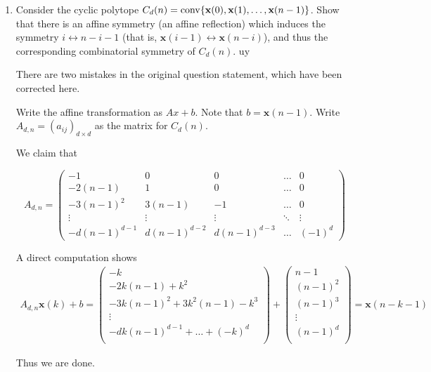 \documentclass{article}
\begin{document}
\begin{enumerate}
\item Consider the cyclic polytope $C_d(n) = \operatorname{conv}\{\textbf{x}(0), \textbf{x}(1), \ldots, \textbf{x}(n-1)\}$.
Show that there is an affine symmetry (an affine reflection) which induces the symmetry
$i \longleftrightarrow n-i-1$ (that is, $\textbf{x}(i-1) \longleftrightarrow \textbf{x}(n-i)$), and thus the
corresponding combinatorial symmetry of $C_d(n)$.
uy
\begin{remark}
    There are two mistakes in the original question statement, which have been corrected here.
\end{remark}
\begin{solution}
Write the affine transformation as $Ax+b$. Note that $b = \textbf{x}(n-1)$. Write $A_{d,n} = (a_{ij})_{d \times d}$ as the matrix for $C_d(n)$.

We claim that

\[A_{d, n} = \begin{pmatrix}
    -1 & 0 & 0 & \ldots & 0 \\
    -2(n-1) & 1 & 0 & \ldots & 0\\
    -3(n-1)^2 & 3(n-1) & -1 &  \ldots & 0 \\
    \vdots & \vdots & \vdots  & \ddots & \vdots \\
    -d(n-1)^{d-1} & d(n-1)^{d-2} & d(n-1)^{d-3} & \ldots & (-1)^{d}
\end{pmatrix}\]

A direct computation shows
\begin{align}
    A_{d,n}\textbf{x}(k) + b = 
    \begin{pmatrix}
        -k \\
        -2k(n-1) + k^2 \\
        -3k(n-1)^2 + 3k^2(n-1) - k^3 \\
        \vdots \\
        -dk(n-1)^{d-1} + \ldots +(-k)^d \\
    \end{pmatrix} + 
    \begin{pmatrix}
        n-1 \\
        (n-1)^2 \\
        (n-1)^3 \\
        \vdots \\
        (n-1)^d \\
    \end{pmatrix} = \textbf{x}(n-k-1)
\end{align}

Thus we are done.


\end{solution}
\end{enumerate}
\end{document}
